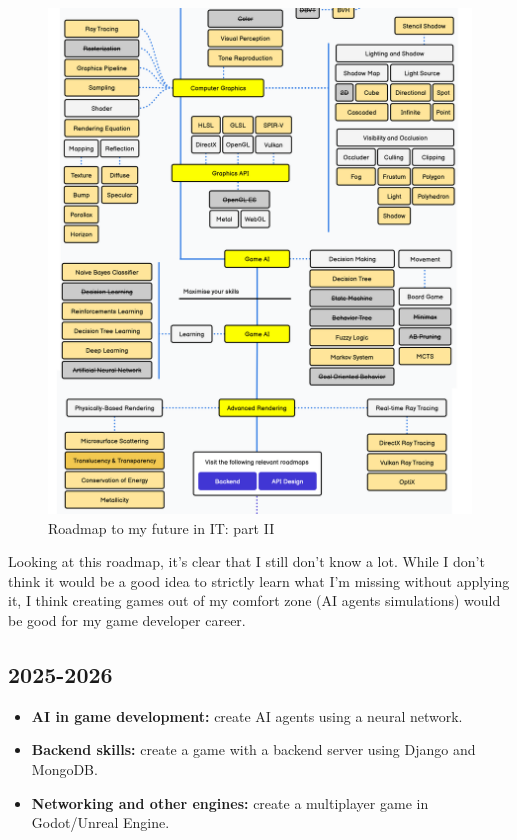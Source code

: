 \documentclass{article}
\begin{document}
\begin{figure}[H]
    \centering
    \includegraphics[width=\textwidth]{images/roadmap_2.png}
    \caption{Roadmap to my future in IT: part II}
    \label{fig:roadmap2}
\end{figure}

Looking at this roadmap, it's clear that I still don't know a lot. While I don't think it would be a good idea to strictly learn what I'm missing without applying it, I think creating games out of my comfort zone (AI agents simulations) would be good for my game developer career.

\subsection{2025-2026}
\begin{itemize}
    \item \textbf{AI in game development:} create AI agents using a neural network.
    \item \textbf{Backend skills:} create a game with a backend server using Django and MongoDB.
    \item \textbf{Networking and other engines:} create a multiplayer game in \\Godot/Unreal Engine.
\end{itemize}
\end{document}

